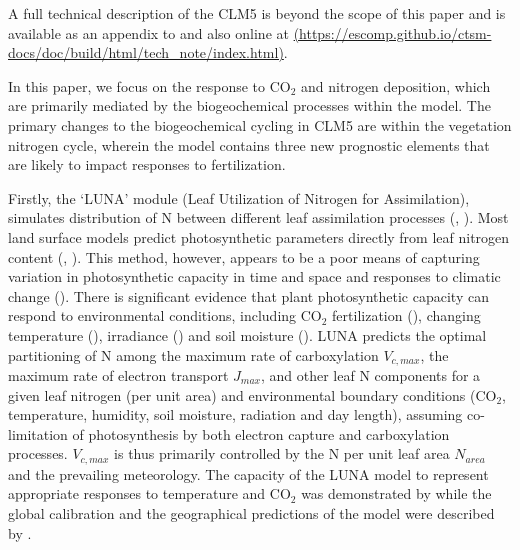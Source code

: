 \usepackage{}\documentclass[draft,linenumbers]{agujournal}
\begin{document}
 A full technical description of the CLM5 is beyond the scope of this paper and is available as an appendix to \cite{lawrence2018} and also online at \url{(https://escomp.github.io/ctsm-docs/doc/build/html/tech_note/index.html)}.

In this paper, we focus on the response to CO$_{2}$ and nitrogen deposition, which are primarily mediated by the biogeochemical processes within the model. The primary changes to the biogeochemical cycling in CLM5 are within the vegetation nitrogen cycle, wherein the model contains three new prognostic elements that are likely to impact responses to fertilization.

Firstly, the  `LUNA' module (Leaf Utilization of Nitrogen for Assimilation),  simulates distribution of N between different leaf assimilation processes (\cite{xu2012}, \cite{ali2016}). Most land surface models predict photosynthetic parameters directly from leaf nitrogen content (\cite{kattge2009}, \cite{bonan2012}). This method, however, appears to be a poor means of capturing variation in photosynthetic capacity in time and space and responses to climatic change (\cite{walker2017}). There is significant evidence that plant photosynthetic capacity can respond to environmental conditions, including CO$_{2}$ fertilization (\cite{ainsworth2007}), changing temperature (\cite{hikosaka2005}), irradiance (\cite{niinemets1998}) and soil moisture (\cite{keenan2009}).  LUNA predicts the optimal partitioning of N among the maximum rate of carboxylation $V_{c,max}$, the maximum rate of electron transport $J_{max}$, and other leaf N components for a given leaf nitrogen (per unit area) and environmental boundary conditions (CO$_{2}$, temperature, humidity, soil moisture, radiation and day length), assuming co-limitation of photosynthesis by both electron capture and carboxylation processes.  $V_{c,max}$ is thus primarily controlled by the N per unit leaf area $N_{area}$ and the prevailing meteorology. The capacity of the LUNA model to represent appropriate responses to temperature and CO$_{2}$ was demonstrated by \cite{xu2012} while the global calibration and the geographical predictions of the model were described by \cite{ali2016}.
\end{document}
